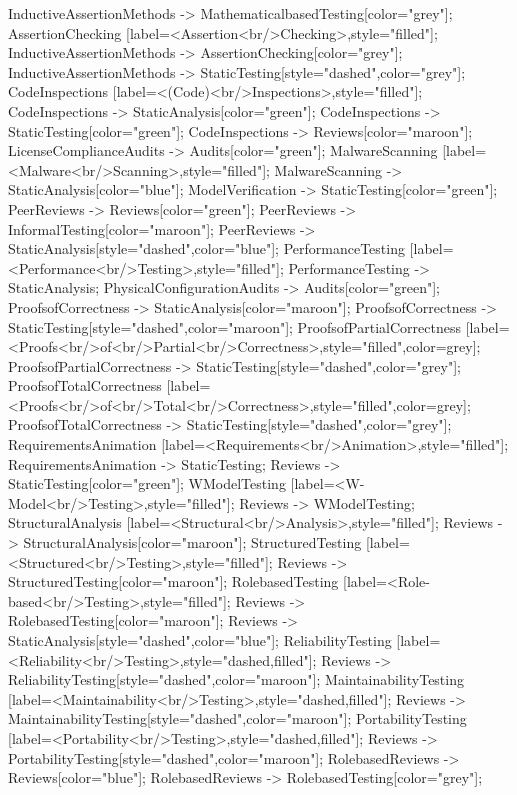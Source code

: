 \documentclass{article}
\begin{document}
{InductiveAssertionMethods -> MathematicalbasedTesting[color="grey"];
AssertionChecking [label=<Assertion<br/>Checking>,style="filled"];
InductiveAssertionMethods -> AssertionChecking[color="grey"];
InductiveAssertionMethods -> StaticTesting[style="dashed",color="grey"];
CodeInspections [label=<(Code)<br/>Inspections>,style="filled"];
CodeInspections -> StaticAnalysis[color="green"];
CodeInspections -> StaticTesting[color="green"];
CodeInspections -> Reviews[color="maroon"];
LicenseComplianceAudits -> Audits[color="green"];
MalwareScanning [label=<Malware<br/>Scanning>,style="filled"];
MalwareScanning -> StaticAnalysis[color="blue"];
ModelVerification -> StaticTesting[color="green"];
PeerReviews -> Reviews[color="green"];
PeerReviews -> InformalTesting[color="maroon"];
PeerReviews -> StaticAnalysis[style="dashed",color="blue"];
PerformanceTesting [label=<Performance<br/>Testing>,style="filled"];
PerformanceTesting -> StaticAnalysis;
PhysicalConfigurationAudits -> Audits[color="green"];
ProofsofCorrectness -> StaticAnalysis[color="maroon"];
ProofsofCorrectness -> StaticTesting[style="dashed",color="maroon"];
ProofsofPartialCorrectness [label=<Proofs<br/>of<br/>Partial<br/>Correctness>,style="filled",color=grey];
ProofsofPartialCorrectness -> StaticTesting[style="dashed",color="grey"];
ProofsofTotalCorrectness [label=<Proofs<br/>of<br/>Total<br/>Correctness>,style="filled",color=grey];
ProofsofTotalCorrectness -> StaticTesting[style="dashed",color="grey"];
RequirementsAnimation [label=<Requirements<br/>Animation>,style="filled"];
RequirementsAnimation -> StaticTesting;
Reviews -> StaticTesting[color="green"];
WModelTesting [label=<W-Model<br/>Testing>,style="filled"];
Reviews -> WModelTesting;
StructuralAnalysis [label=<Structural<br/>Analysis>,style="filled"];
Reviews -> StructuralAnalysis[color="maroon"];
StructuredTesting [label=<Structured<br/>Testing>,style="filled"];
Reviews -> StructuredTesting[color="maroon"];
RolebasedTesting [label=<Role-based<br/>Testing>,style="filled"];
Reviews -> RolebasedTesting[color="maroon"];
Reviews -> StaticAnalysis[style="dashed",color="blue"];
ReliabilityTesting [label=<Reliability<br/>Testing>,style="dashed,filled"];
Reviews -> ReliabilityTesting[style="dashed",color="maroon"];
MaintainabilityTesting [label=<Maintainability<br/>Testing>,style="dashed,filled"];
Reviews -> MaintainabilityTesting[style="dashed",color="maroon"];
PortabilityTesting [label=<Portability<br/>Testing>,style="dashed,filled"];
Reviews -> PortabilityTesting[style="dashed",color="maroon"];
RolebasedReviews -> Reviews[color="blue"];
RolebasedReviews -> RolebasedTesting[color="grey"];
}
\end{document}
